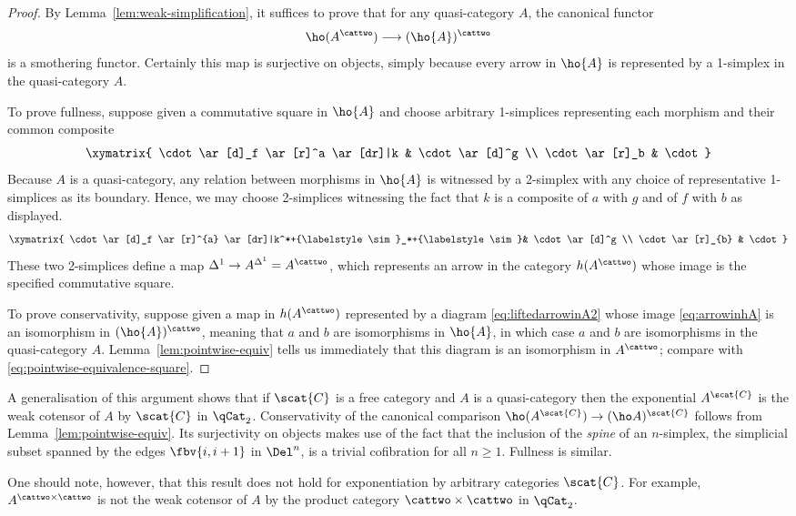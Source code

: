 \begin{proof}
   By Lemma~\ref{lem:weak-simplification}, it suffices to prove that for any quasi-category $A$, the canonical functor \[ \ho(A^\cattwo) \longrightarrow (\ho{A})^\cattwo\] is a smothering functor. Certainly this map is surjective on objects, simply because every arrow in $\ho{A}$ is represented by a 1-simplex in the quasi-category $A$. 

To prove fullness, suppose given a commutative square in $\ho{A}$ and choose arbitrary 1-simplices representing each morphism  and their common composite \begin{equation}\label{eq:arrowinhA}\xymatrix{ \cdot \ar[d]_f \ar[r]^a  \ar[dr]|k & \cdot \ar[d]^g \\ \cdot \ar[r]_b & \cdot}\end{equation} Because $A$ is a quasi-category, any relation between morphisms in $\ho{A}$ is witnessed by a 2-simplex with any choice of representative 1-simplices as its boundary. Hence, we may choose 2-simplices witnessing the fact that $k$ is a composite of $a$ with $g$ and of $f$ with $b$ as displayed. 
 \begin{equation}\label{eq:liftedarrowinA2} \xymatrix{ \cdot \ar[d]_f \ar[r]^{a} \ar[dr]|k^*+{\labelstyle\sim}_*+{\labelstyle \sim}& \cdot \ar[d]^g \\ \cdot \ar[r]_{b} & \cdot}\end{equation}
These two 2-simplices define a map $\Delta^1  \to A^{\Delta^1} = A^\cattwo$, which represents an arrow in the category $h(A^{\cattwo})$ whose image is the specified commutative square.

To prove conservativity, suppose given a map in $h(A^{\cattwo})$ represented by a diagram  \eqref{eq:liftedarrowinA2} whose image  \eqref{eq:arrowinhA} is an isomorphism in $(\ho{A})^\cattwo$, meaning that $a$ and $b$ are isomorphisms in $\ho{A}$, in which case $a$ and $b$ are isomorphisms in the quasi-category $A$. Lemma~\ref{lem:pointwise-equiv} tells us immediately that this diagram is an isomorphism in $A^\cattwo$; compare with \eqref{eq:pointwise-equivalence-square}.
\end{proof}

\begin{rmk}
  A generalisation of this argument shows that if $\scat{C}$ is a free category and $A$ is a quasi-category then the exponential $A^\scat{C}$ is the weak cotensor of $A$ by $\scat{C}$ in $\qCat_2$. Conservativity of the canonical comparison $\ho(A^\scat{C})\to(\ho A)^\scat{C}$ follows from Lemma~\ref{lem:pointwise-equiv}. Its surjectivity on objects makes use of the fact that the inclusion of the \emph{spine} of an $n$-simplex, the simplicial subset spanned by the edges $\fbv{i,i+1}$ in $\Del^n$, is a trivial cofibration for all $n \geq 1$. Fullness is similar.

One should note, however, that this result does not hold for exponentiation by arbitrary categories $\scat{C}$. For example,  $A^{\cattwo\times\cattwo}$ is not the weak cotensor of $A$ by the product category $\cattwo\times\cattwo$ in $\qCat_2$.
\end{rmk}

